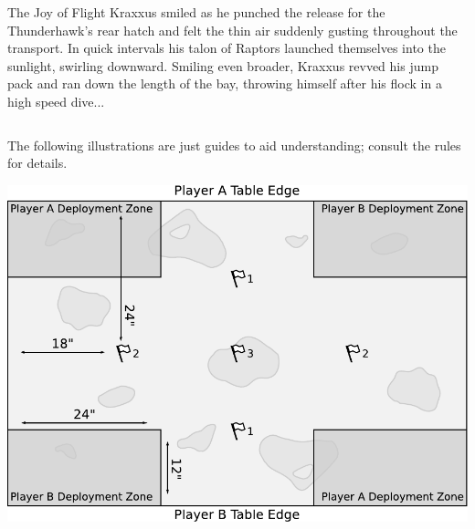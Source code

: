 \documentclass{40k}
\begin{document}
\begin{columns}

\vfill
\begin{story}{62pt}{The Joy of Flight}
  Kraxxus smiled as he punched the release for the Thunderhawk's rear
  hatch and felt the thin air suddenly gusting throughout the
  transport.  In quick intervals his talon of Raptors launched
  themselves into the sunlight, swirling downward.  Smiling even
  broader, Kraxxus revved his jump pack and ran down the length of the
  bay, throwing himself after his flock in a high speed dive...
\end{story}

\end{columns}

\clearpage
{}

The following illustrations are just guides to aid understanding;
consult the rules for details.


\bigskip\centerline{\includegraphics[scale=0.6]{maps/mission1}}

\end{document}

